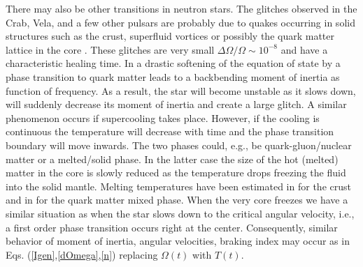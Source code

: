 \begin{multicols}{2}
There may also be other transitions in neutron stars. The glitches
observed in the Crab, Vela, and a few other pulsars are probably due
to quakes occurring in solid structures such as the crust, 
superfluid vortices or possibly the quark matter lattice in the
core \cite{HH}. These glitches are very small $\Delta\Omega/\Omega\sim
10^{-8}$ and have a characteristic healing time.  In \cite{GPW} a
drastic softening of the equation of state by a phase
transition to quark matter leads to a
backbending moment of inertia as function of frequency. As a result,
the star will become unstable as it slows down, will suddenly decrease
its moment of inertia and create a large glitch. 
A similar phenomenon occurs if supercooling takes place.
However, if
the cooling is continuous the temperature will decrease with time
and the phase transition boundary will move inwards.
The two phases could, e.g., be quark-gluon/nuclear matter
or a melted/solid phase. In the latter case the size of the hot
(melted) matter in the core is slowly reduced as the temperature drops
freezing the fluid into the solid mantle. 
Melting temperatures have been estimated in
\cite{LPR,melt} for the crust and in \cite{HPS} for the quark matter
mixed phase.  
When the very core freezes we have a
similar situation as when the star slows down to the critical angular
velocity, i.e., a first order phase transition occurs right at the
center. Consequently, similar behavior of moment of inertia, angular
velocities, braking index may occur as in
Eqs. (\ref{Igen},\ref{dOmega},\ref{n}) replacing $\Omega(t)$ with
$T(t)$.


\end{multicols}
